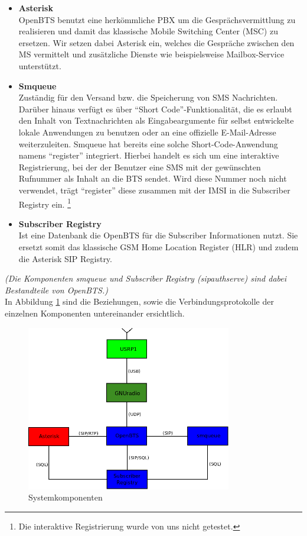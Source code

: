 \begin{itemize}
\item \textbf{Asterisk}\\
OpenBTS benutzt eine herkömmliche PBX um die Gesprächsvermittlung zu realisieren und damit das klassische Mobile Switching Center (MSC) zu ersetzen. Wir setzen dabei Asterisk ein, welches die Gespräche zwischen den MS vermittelt und zusätzliche Dienste wie beispielsweise Mailbox-Service unterstützt. 
\end{itemize}
\begin{itemize}
\item \textbf{Smqueue}\\
Zuständig für den Versand bzw. die Speicherung von SMS Nachrichten. Darüber hinaus verfügt es über "`Short Code"'-Funktionalität, die es erlaubt den Inhalt von Textnachrichten als Eingabeargumente für selbst entwickelte lokale Anwendungen zu benutzen oder an eine offizielle E-Mail-Adresse weiterzuleiten.
Smqueue hat bereits eine solche Short-Code-Anwendung namens "`register"' integriert. Hierbei handelt es sich um eine interaktive Registrierung, bei der der Benutzer eine SMS mit der gewünschten Rufnummer als Inhalt an die BTS sendet. Wird diese Nummer noch nicht verwendet, trägt "`register"' diese zusammen mit der IMSI in die Subscriber Registry ein. \footnote{Die interaktive Registrierung wurde von uns nicht getestet.}
\end{itemize}
\begin{itemize}
\item \textbf{Subscriber Registry}\\
Ist eine Datenbank die OpenBTS für die Subscriber Informationen nutzt. Sie ersetzt somit das klassische GSM Home Location Register (HLR) und zudem die Asterisk SIP Registry.
\end{itemize}

\textit{(Die Komponenten smqueue und Subscriber Registry (sipauthserve) sind dabei Bestandteile von OpenBTS.)}\\

In Abbildung \ref{fig:openbts_comp} sind die Beziehungen, sowie die Verbindungsprotokolle der einzelnen Komponenten untereinander ersichtlich.

\begin{figure}[htbp]
	\centering
		\includegraphics[width=0.80\textwidth]{img/openbts_comp.png}
	\caption{Systemkomponenten}
	\label{fig:openbts_comp}
\end{figure}



